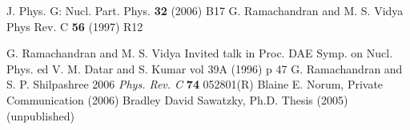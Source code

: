 \begin{thebibliography}{99}
J. Phys. G: Nucl. Part. Phys. {\bf 32} (2006) B17
  G. Ramachandran and M. S. Vidya Phys Rev. C {\bf 56} (1997) R12

G. Ramachandran and M. S. Vidya Invited talk in Proc. DAE Symp. on Nucl. Phys. ed V. M. Datar and S. Kumar vol 39A (1996) p 47
 G. Ramachandran and S. P. Shilpashree 2006 {\it Phys. Rev. C}  {\bf 74} 052801(R)
 Blaine E. Norum, Private Communication (2006)
 Bradley David Sawatzky, Ph.D. Thesis (2005) (unpublished)
\end{thebibliography}

